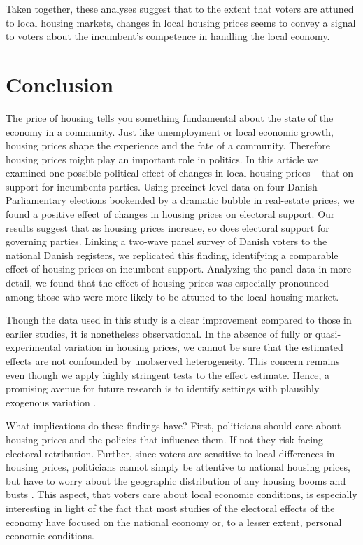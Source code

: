 \documentclass[12pt,a4paper]{article}
\begin{document}
Taken together, these analyses suggest that to the extent that voters are attuned to local housing markets, changes in local housing prices seems to convey a signal to voters about the incumbent's competence in handling the local economy.
		
\section{Conclusion}
	The price of housing tells you something fundamental about the state of the economy in a community. Just like unemployment or local economic growth, housing prices shape the experience and the fate of a community. Therefore housing prices might play an important role in politics. In this article we examined one possible political effect of changes in local housing prices – that on support for incumbents parties. Using precinct-level data on four Danish Parliamentary elections bookended by a dramatic bubble in real-estate prices, we found a positive effect of changes in housing prices on electoral support. Our results suggest that as housing prices increase, so does electoral support for governing parties. Linking a two-wave panel survey of Danish voters to the national Danish registers, we replicated this finding, identifying a comparable effect of housing prices on incumbent support. Analyzing the panel data in more detail, we found that the effect of housing prices was especially pronounced among those who were more likely to be attuned to the local housing market. 
	
	Though the data used in this study is a clear improvement compared to those in earlier studies, it is nonetheless observational. In the absence of fully or quasi-experimental variation in housing prices, we cannot be sure that the estimated effects are not confounded by unobserved heterogeneity. This concern remains even though we apply highly stringent tests to the effect estimate. Hence, a promising avenue for future research is to identify settings with plausibly exogenous variation \citep[cf.]{jerzak2016property}.
	
	What implications do these findings have? First, politicians should care about housing prices and the policies that influence them. If not they risk facing electoral retribution. Further, since voters are sensitive to  local differences in housing prices, politicians cannot simply be attentive to national housing prices, but have to worry about the geographic distribution of any housing booms and busts \citep[cf.][11]{ferejohn1986incumbent}. This aspect, that voters care about local economic conditions, is especially interesting in light of the fact that most studies of the electoral effects of the economy have focused on the national economy or, to a lesser extent, personal economic conditions.
	
\end{document}

